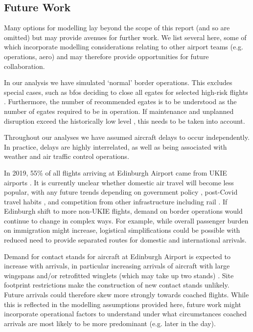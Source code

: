 \documentclass[10pt]{article}
\begin{document}
\vspace{10pt}

\subsection{Future Work}
Many options for modelling lay beyond the scope of this report (and so are omitted) but may provide avenues for further work. We list several here, some of which incorporate modelling considerations relating to other airport teams (e.g. operations, aero) and may therefore provide opportunities for future collaboration.

In our analysis we have simulated `normal' border operations. This excludes special cases, such as \glspl{bfo} deciding to close all \glspl{egate} for selected high-risk flights \cite{Inspection_eGates}.  Furthermore, the number of recommended \glspl{egate} is to be understood as the number of \glspl{egate} required to be in operation. If maintenance and unplanned disruption exceed the historically low level \cite{Inspection_eGates}, this needs to be taken into account.

Throughout our analyses we have assumed aircraft delays to occur independently. In practice, delays are highly interrelated, as well as being associated with weather and air traffic control operations.

In 2019, 55\% of all flights arriving at Edinburgh Airport came from UKIE airports \cite{noise_lab}. It is currently unclear whether domestic air travel will become less popular, with any future trends depending on government policy \cite{flight_tax_independent}, post-Covid travel habits \cite{post_covid_flights}, and competition from other infrastructure including rail \cite{train_airplane_guardian}. If Edinburgh shift to more non-UKIE flights, demand on border operations would continue to change in complex ways. For example, while overall passenger burden on immigration might increase, logistical simplifications could be possible with reduced need to provide separated routes for domestic and international arrivals.

Demand for contact stands for aircraft at Edinburgh Airport is expected to increase with arrivals, in particular increasing arrivals of aircraft with large wingspans and/or retrofitted winglets (which may take up two stands) \cite{dijk2019recoverable}. Site footprint restrictions make the construction of new contact stands unlikely. Future arrivals could therefore skew more strongly towards coached flights. While this is reflected in the modelling assumptions provided here, future work might incorporate operational factors to understand under what circumstances coached arrivals are most likely to be more predominant (e.g. later in the day). 
\end{document}
